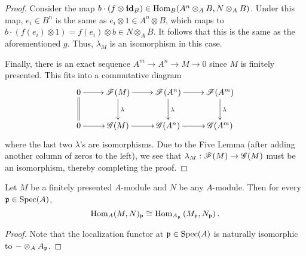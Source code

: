 \begin{proof}
    Consider the map $b\cdot(f\otimes\mathbf{id}_B)\in\operatorname{Hom}_B(A^n\otimes_A B, N\otimes_A B)$. Under this map, $e_i\in B^n$ is the same as $e_i\otimes 1\in A^n\otimes B$, which maps to $b\cdot(f(e_i)\otimes 1) = f(e_i)\otimes b\in N\otimes_A B$. It follows that this is the same as the aforementioned $g$. Thus, $\lambda_M$ is an isomorphism in this case.

    Finally, there is an exact sequence $A^m\to A^n\to M\to 0$ since $M$ is finitely presented. This fits into a commutative diagram 
    \begin{equation*}
        \xymatrix {
            0\ar[r]\ar@{=}[d] & \scrF(M)\ar[r]\ar[d]^\lambda & \scrF(A^n)\ar[r]\ar[d]^\lambda & \scrF(A^m)\ar[d]^\lambda\\
            0\ar[r] & \scrG(M)\ar[r] & \scrG(A^n)\ar[r] & \scrG(A^m)\\
        }
    \end{equation*}
    where the last two $\lambda$'s are isomorphisms. Due to the Five Lemma (after adding another column of zeros to the left), we see that $\lambda_M:\mathscr F(M)\to\mathscr{G}(M)$ must be an isomorphism, thereby completing the proof.
\end{proof}

\begin{corollary}
    Let $M$ be a finitely presented $A$-module and $N$ be any $A$-module. Then for every $\mathfrak{p}\in\operatorname{Spec}(A)$, 
    \begin{equation*}
        \operatorname{Hom}_A(M, N)_{\mathfrak{p}}\cong\operatorname{Hom}_{A_{\mathfrak{p}}}\left(M_{\mathfrak{p}}, N_{\mathfrak{p}}\right).
    \end{equation*}
\end{corollary}
\begin{proof}
    Note that the localization functor at $\mathfrak{p}\in\operatorname{Spec}(A)$ is naturally isomorphic to $-\otimes_A A_{\mathfrak{p}}$.
\end{proof}

